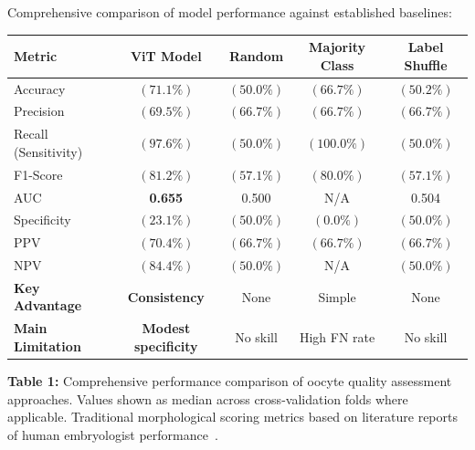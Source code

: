 Comprehensive comparison of model performance against established baselines:

\begin{center}
\small
\begin{tabular}{lcccc}
\hline
\textbf{Metric} & \textbf{ViT Model} & \textbf{Random} & \textbf{Majority Class} & \textbf{Label Shuffle} \\
\hline
Accuracy & \textbf{$(71.1\%)$} & $(50.0\%)$ & $(66.7\%)$ & $(50.2\%)$ \\
Precision & \textbf{$(69.5\%)$} & $(66.7\%)$ & $(66.7\%)$ & $(66.7\%)$ \\
Recall (Sensitivity) & $(97.6\%)$ & $(50.0\%)$ & \textbf{$(100.0\%)$} & $(50.0\%)$ \\
F1-Score & \textbf{$(81.2\%)$} & $(57.1\%)$ & $(80.0\%)$ & $(57.1\%)$ \\
AUC & \textbf{0.655} & 0.500 & N/A & 0.504 \\
Specificity & $(23.1\%)$ & \textbf{$(50.0\%)$} & $(0.0\%)$ & \textbf{$(50.0\%)$} \\
PPV & \textbf{$(70.4\%)$} & $(66.7\%)$ & $(66.7\%)$ & $(66.7\%)$ \\
NPV & \textbf{$(84.4\%)$} & $(50.0\%)$ & N/A & $(50.0\%)$ \\
\hline
\textbf{Key Advantage} & \textbf{Consistency} & None & Simple & None \\
\textbf{Main Limitation} & \textbf{Modest specificity} & No skill & High FN rate & No skill \\
\hline
\end{tabular}
\end{center}

\textbf{Table 1:} Comprehensive performance comparison of oocyte quality assessment approaches. Values shown as median across cross-validation folds where applicable. Traditional morphological scoring metrics based on literature reports of human embryologist performance~\cite{paternot2009observer,paternot2011multicentre,fordham2022embryologist}. 